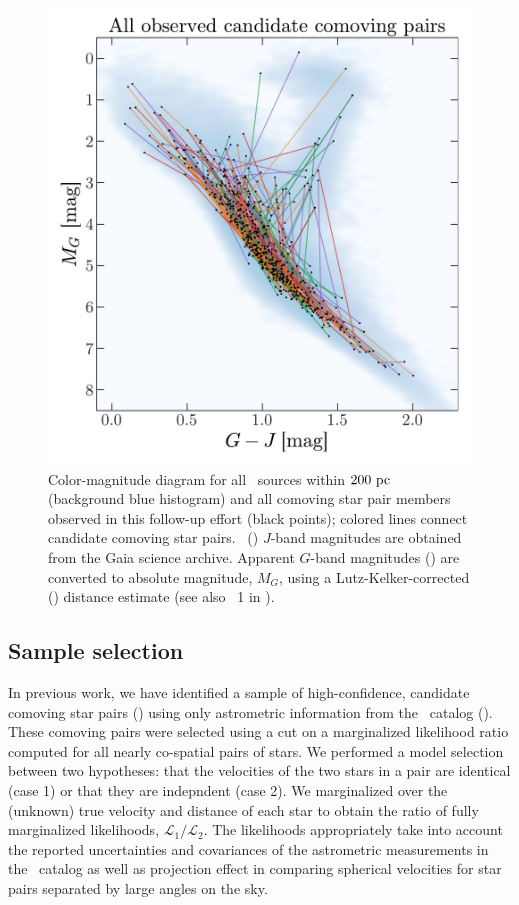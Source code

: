 \documentclass[modern, letterpaper]{aastex61}
\newcommand{\tgas}{\acronym{TGAS}}
\newcommand{\tmass}{\acronym{2MASS}}
\begin{document}
\begin{figure}[htb!]
  \begin{center}
    \includegraphics[width=0.8\linewidth]{sample_cmd.pdf}
  \end{center}
  \caption{%
    Color-magnitude diagram for all \tgas\ sources within $200~\mathrm{pc}$ (background
    blue histogram) and all comoving star pair members observed in this
    follow-up effort (black points); colored lines connect candidate comoving
    star pairs.
    \tmass\ (\citealt{Skrutskie:2006}) $J$-band magnitudes are obtained
    from the Gaia science archive.
    Apparent $G$-band magnitudes (\citealt{Carrasco:2016}) are converted to
    absolute magnitude, $M_G$, using a Lutz-Kelker-corrected
    (\citealt{Lutz:1973}) distance estimate (see also \eqname~1 in
    \citealt{Oh:2017}).
    \label{fig:sample-cmd}}
\end{figure}

\subsection{Sample selection}\label{sec:sample}

In previous work, we have identified a sample of high-confidence, candidate
comoving star pairs (\citealt{Oh:2017}) using only astrometric information from
the \tgas\ catalog (\citealt{Michalik:2015,Gaia-Collaboration:2016a}).
These comoving pairs were selected using a cut on a marginalized likelihood
ratio computed for all nearly co-spatial pairs of stars.
We performed a model selection between two hypotheses: that the velocities of
the two stars in a pair are identical (case 1) or that they are indepndent (case
2).
We marginalized over the (unknown) true velocity and distance of each star to
obtain the ratio of fully marginalized likelihoods,
$\mathcal{L}_1/\mathcal{L}_2$.
The likelihoods appropriately take into account the reported uncertainties and
covariances of the astrometric measurements in the \tgas\ catalog
as well as projection effect in comparing spherical
velocities for star pairs separated by large angles on the sky.
\end{document}

